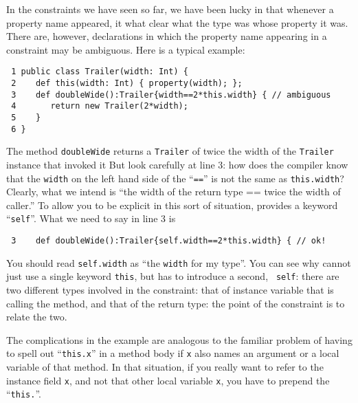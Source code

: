 In the constraints we have seen so far, we have been lucky in that whenever
a property name appeared, it what clear what the type was whose property 
it was.   There are, however, declarations in which
the property name appearing in a constraint may be ambiguous.  Here is a
typical example:
\begin{verbatim}
 1 public class Trailer(width: Int) {
 2    def this(width: Int) { property(width); };
 3    def doubleWide():Trailer{width==2*this.width} { // ambiguous
 4       return new Trailer(2*width);
 5    }
 6 }
\end{verbatim}
The method {\tt doubleWide} returns a {\tt Trailer} of twice the width
of the {\tt Trailer} instance that invoked it  But look carefully at line 3:
how does the compiler know that the {\tt width} on the left hand side
of the ``{\tt ==}'' is not the same as {\tt this.width}?  Clearly, what we
intend is ``the width of the return type == twice the width of caller.''
To allow you to be explicit in this sort of situation, \Xten{} provides a
keyword ``{\tt self}''.  What we need to say in line 3 is
\begin{verbatim}
 3    def doubleWide():Trailer{self.width==2*this.width} { // ok!
\end{verbatim}
You should read {\tt self.width} as ``the {\tt width} for my type''.
You can see why \Xten{} cannot
just use a single keyword {\tt this}, but has to introduce a second, {\tt
self}: there are two different types involved in the constraint: that of
instance variable that is calling the method, and that of the
return type: the point of the constraint is to relate the two.

The complications in the example are analogous to the familiar problem
of having to spell out ``{\tt this.x}'' in a method body if
 {\tt x} also names an argument or a local
variable of that method.  In that situation, if you really want to refer to the
instance field {\tt x}, and not that other local variable {\tt x}, you have to prepend the
``{\tt this.}''.

